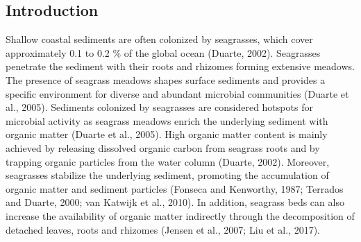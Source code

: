 \documentclass[12pt,]{article}
\begin{document}
\newpage

\hypertarget{introduction}{%
\subsection{Introduction}\label{introduction}}

Shallow coastal sediments are often colonized by seagrasses, which cover
approximately 0.1 to 0.2 \% of the global ocean (Duarte, 2002).
Seagrasses penetrate the sediment with their roots and rhizomes forming
extensive meadows. The presence of seagrass meadows shapes surface
sediments and provides a specific environment for diverse and abundant
microbial communities (Duarte et al., 2005). Sediments colonized by
seagrasses are considered hotspots for microbial activity as seagrass
meadows enrich the underlying sediment with organic matter (Duarte et
al., 2005). High organic matter content is mainly achieved by releasing
dissolved organic carbon from seagrass roots and by trapping organic
particles from the water column (Duarte, 2002). Moreover, seagrasses
stabilize the underlying sediment, promoting the accumulation of organic
matter and sediment particles (Fonseca and Kenworthy, 1987; Terrados and
Duarte, 2000; van Katwijk et al., 2010). In addition, seagrass beds can
also increase the availability of organic matter indirectly through the
decomposition of detached leaves, roots and rhizomes (Jensen et al.,
2007; Liu et al., 2017).
\end{document}
